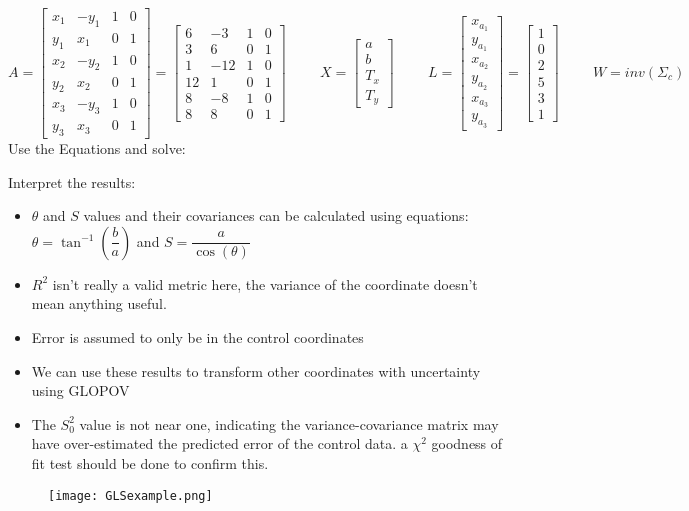 \[
A = \begin{bmatrix}
x_1 & -y_1 & 1 & 0\\
y_1 & x_1 & 0 & 1\\
x_2 & -y_2 & 1 & 0\\
y_2 & x_2 & 0 & 1\\
x_3 & -y_3 & 1 & 0\\
y_3 & x_3 & 0 & 1
\end{bmatrix} =
\begin{bmatrix}
6 & -3 & 1 & 0\\
3 & 6 & 0 & 1\\
1 & -12 & 1 & 0\\
12 & 1 & 0 & 1\\
8 & -8 & 1 & 0\\
8 & 8 & 0 & 1
\end{bmatrix}
\hspace{1cm}
X = 
\begin{bmatrix}
a \\ b \\ T_x \\ T_y 
\end{bmatrix}
\hspace{1cm}
L =
\begin{bmatrix}
x_{a_1} \\ y_{a_1} \\ x_{a_2} \\ y_{a_2} \\ x_{a_3} \\ y_{a_3}
\end{bmatrix} = 
\begin{bmatrix}
1 \\ 0 \\2 \\5 \\3 \\1 
\end{bmatrix}
\hspace{1cm}
W = inv(\Sigma_c)
\]
\clearpage
Use the Equations and solve:

Interpret the results:
\begin{itemize}
	\item $\theta$ and $S$ values and their covariances can be calculated using equations: $\theta = \tan^{-1}(\dfrac{b}{a})$ and $S = \dfrac{a}{\cos(\theta)}$
	\item $R^2$ isn't really a valid metric here, the variance of the coordinate doesn't mean anything useful.
	\item Error is assumed to only be in the control coordinates
	\item We can use these results to transform other coordinates with uncertainty using GLOPOV
	\item The $S_0^2$ value is not near one, indicating the variance-covariance matrix may have over-estimated the predicted error of the control data. a $\chi^2$ goodness of fit test should be done to confirm this.  
\end{itemize}
\begin{figure}[H]
	\centering
	\texttt{[image: GLSexample.png]}
\end{figure}

